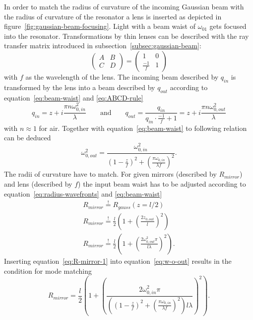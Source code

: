 In order to match the radius of curvature of the incoming Gaussian beam with the radius of curvature of the resonator a lens is inserted as depicted in figure~\ref{fig:gaussian-beam-focusing}. Light with a beam waist of $\omega_{01}$ gets focused into the resonator. Transformations by thin lenses can be described with the ray transfer matrix introduced in subsection~\ref{subsec:gaussian-beam}:
\begin{equation}
\begin{pmatrix}
A & B \\
C & D
\end{pmatrix}
=
\begin{pmatrix}
1 & 0 \\
\frac{-1}{f} & 1
\end{pmatrix}
\end{equation}
with $f$ as the wavelength of the lens.
The incoming beam described by $q_{in}$ is transformed by the lens into a beam described by $q_{out}$ according to equation~\eqref{eq:beam-waist} and \eqref{eq:ABCD-rule}
\begin{equation}
q_{in} = z + i \frac{\pi n \omega_{0,in}^2}{\lambda} \qquad \mathrm{and} \qquad
q_{out} = \frac{q_{in}}{q_{in} \cdot \frac{-1}{f} + 1} =  z + i \frac{\pi n \omega_{0,out}^2}{\lambda}
\end{equation}
with $n\approx 1$ for air. Together with equation~\eqref{eq:beam-waist} to following relation can be deduced
\begin{equation}
\label{eq:w-o-out}
\omega_{0,out}^2 = \frac{\omega_{0,in}^2}{\left(1-\frac{z}{f}\right)^2+\left(\frac{\pi \omega_{0,in}}{\lambda f}\right)^2}.
\end{equation}
The radii of curvature have to match.
For given mirrors (described by $R_{mirror}$) and lens (described by $f$) the input beam waist has to be adjusted according to equation~\eqref{eq:radius-wavefronts} and \eqref{eq:beam-waist}
\begin{align}
R_{mirror} \stackrel{!}{=} R_{gauss}(z= l/2)\\
R_{mirror} \stackrel{!}{=} \frac{l}{2} \left(1+\left(\frac{2z_{0,out}}{l}\right)^2\right) \\
\label{eq:R-mirror-1}
R_{mirror} \stackrel{!}{=} \frac{l}{2} \left(1+\left(\frac{2\omega_{0,out}^2 \pi}{l \lambda}\right)^2\right).
\end{align}
Inserting equation~\eqref{eq:R-mirror-1} into equation~\eqref{eq:w-o-out} results in the condition for mode matching
\begin{equation}
\label{eq:R-mirror-2}
R_{mirror} = \frac{l}{2} \left(1+\left(\frac{2 \omega_{0,in}^2 \pi}{\left(\left(1-\frac{z}{f}\right)^2+\left(\frac{\pi \omega_{0,in}}{\lambda f}\right)^2\right)l \lambda}\right)^2\right).
\end{equation}

